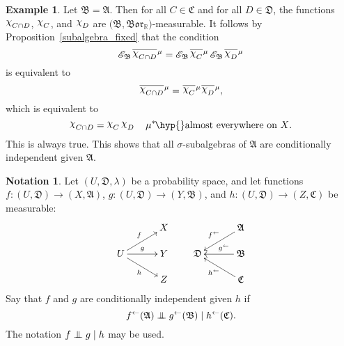 \documentclass[
twoside=true,
paper=letter,
fontsize=9pt,
pagesize=auto,
leqno,
openany,
headsepline,
overfullrule,
]{scrbook}
\theoremstyle{plain}
\theoremstyle{plain}
\theoremstyle{definition}
\newtheorem{example}[thm]{Example}
\newtheorem{notn}[thm]{Notation}
\theoremstyle{bfnoteitalic}
\theoremstyle{bfnoteroman}
\newcommand{\sigalg}[1]{\mathfrak{#1}}
\newcommand{\cali}[1]{\mathscr{#1}}
\newcommand{\condexpsub}[2]
{\mathop{\cali{E}\hspace{-1.5pt}}\nolimits_{#2}\hspace{-1pt}#1}
\newcommand{\borel}{\mathfrak{Bor}}
\newcommand{\textsigma}{\hbox{\large{$\sigma$}}\kern-1pt}
\newcommand{\charfunction}[1]{\mathop{{\raisebox{2pt}{$\chi$}}_{#1}}}
\newcommand{\preimage}[1]{\mathop{#1^{\leftarrow}}}
\newcommand{\R}{\mathbb{R}}
\newcommand{\meets}{\cap}
\newcommand{\sigmaalgebra}{\sigalg{A}}
\newcommand{\sigmaalgebraii}{\sigalg{B}}
\newcommand{\sigmaalgebraiii}{\sigalg{C}}
\newcommand{\sigmaalgebraiv}{\sigalg{D}}
\newcommand{\kernast}{\ast\kern-1pt}
\newcommand{\funcf}{f}
\newcommand{\funcg}{g}
\newcommand{\funch}{h}
\newcommand{\function}{f}
\newcommand{\functionii}{g}
\newcommand{\functioniii}{h}
\newcommand{\measurespace}{X}
\newcommand{\measurespaceii}{Y}
\newcommand{\measurespaceiii}{Z}
\newcommand{\measure}{\mu}
\newcommand{\measureiii}{\lambda}
\newcommand{\setiii}{C}
\newcommand{\setiv}{D}
\newcommand{\uspace}{U}%
\newcommand{\uspacesig}{\sigalg{D}}
\newcommand{\condindep}[3]{#1\perp\kern-6pt\perp #2\mid #3}
\newcommand*\xbar[1]{%
   \hbox{%
     \vbox{%
       \hrule height 0.4pt %
       \kern0.4ex%
       \hbox{%
         \ensuremath{#1}%
       }%
     }%
   }%
}
\newcommand{\lebclass}[1]{\hspace{.5pt}\xbar{#1}\hspace{0.5pt}}
\newcommand{\ellclass}[2]{\lebclass{#1}^{#2}}
\begin{document}
\begin{example}
Let $\sigmaalgebraii = \sigmaalgebra$.
Then for all $\setiii\in\sigmaalgebraiii$ and for all $\setiv\in\sigmaalgebraiv$,
the functions
$\charfunction{\setiii\meets\setiv}$, $\charfunction{\setiii}$,
and $\charfunction{\setiv}$ are
$\bigl( \sigmaalgebraii, \borel_\R \bigr)$\hyp{}measurable.
It follows by Proposition~\ref{subalgebra_fixed} that the condition
\[
\condexpsub{\ellclass{\charfunction{\setiii\meets\setiv}}{\measure}}{\sigmaalgebraii}
=
\condexpsub{\ellclass{\charfunction{\setiii}}{\measure}}{\sigmaalgebraii}
\condexpsub{\ellclass{\charfunction{\setiv}}{\measure}}{\sigmaalgebraii}
\]
is equivalent to
\[
\ellclass{\charfunction{\setiii\meets\setiv}}{\measure}
=
\ellclass{\charfunction{\setiii}}{\measure}
\ellclass{\charfunction{\setiv}}{\measure},
\]
which is equivalent to
\[
\charfunction{\setiii\meets\setiv}
=
\charfunction{\setiii}
\charfunction{\setiv}
\quad\text{$\measure^\kernast$\hyp{}almost everywhere on $\measurespace$.}
\]
This is always true.
This shows that all \textsigma\hyp{}subalgebras of $\sigmaalgebra$ are conditionally independent given $\sigmaalgebra$.
\end{example}


\begin{notn}\label{conditionally_independent_functions}
Let
$(\uspace,\uspacesig,\measureiii)$
be a probability space, and let functions
$\function:(\uspace,\uspacesig)\to (\measurespace,\sigmaalgebra)$,
$\functionii:(\uspace,\uspacesig)\to (\measurespaceii,\sigmaalgebraii)$,
and
$\functioniii:(\uspace,\uspacesig)\to (\measurespaceiii,\sigmaalgebraiii)$
be measurable:
\[
\xymatrix@R=14pt@C=30pt{
 & \measurespace \\
 \uspace
 \ar[ur]^\function
 \ar[r]^\functionii
 \ar[dr]_\functioniii
 & \measurespaceii\\
 & \measurespaceiii \\
}
%
\qquad
%
\xymatrix@R=14pt@C=30pt{
 & \sigmaalgebra \ar[dl]_{\preimage{\function}} \\
 \uspacesig & \sigmaalgebraii \ar[l]_-{\quad \preimage{\functionii}}\\
 & \sigmaalgebraiii \ar[ul]^{\preimage{\functioniii}}\\
}
\]
Say that $\funcf$ and $\funcg$ are conditionally independent
given $\funch$ if
\[
\condindep{\preimage{\funcf}(\sigmaalgebra)}{\preimage{\funcg}(\sigmaalgebraii)}
{\preimage{\funch}(\sigmaalgebraiii)}.
\]
The notation
$\condindep{\funcf}{\funcg}{\funch}$ may be used.
\end{notn}
\end{document}

